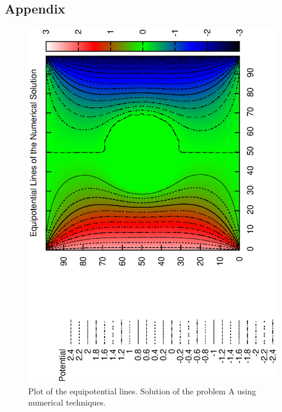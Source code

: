 \documentclass[12pt]{article}
\begin{document}
\subsection*{Appendix}

\begin{figure}
	\centering
	\caption{Plot of the equipotential lines. Solution of the problem A using numerical techniques.}
	\label{fig:jan301}
	\includegraphics[scale=0.7, angle=-90]{./Jan30/equipotential.eps}
\end{figure}
\end{document}
